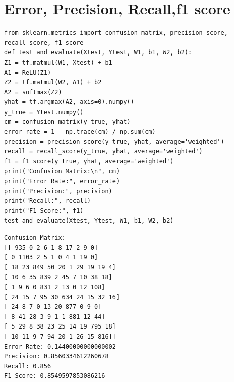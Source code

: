 \section{Error, Precision, Recall,f1 score}
\begin{lstlisting}
from sklearn.metrics import confusion_matrix, precision_score, recall_score, f1_score
def test_and_evaluate(Xtest, Ytest, W1, b1, W2, b2):
Z1 = tf.matmul(W1, Xtest) + b1
A1 = ReLU(Z1)
Z2 = tf.matmul(W2, A1) + b2
A2 = softmax(Z2)
yhat = tf.argmax(A2, axis=0).numpy()
y_true = Ytest.numpy()
cm = confusion_matrix(y_true, yhat)
error_rate = 1 - np.trace(cm) / np.sum(cm)
precision = precision_score(y_true, yhat, average='weighted')
recall = recall_score(y_true, yhat, average='weighted')
f1 = f1_score(y_true, yhat, average='weighted')
print("Confusion Matrix:\n", cm)
print("Error Rate:", error_rate)
print("Precision:", precision)
print("Recall:", recall)
print("F1 Score:", f1)
test_and_evaluate(Xtest, Ytest, W1, b1, W2, b2)
\end{lstlisting}
\begin{verbatim}              
Confusion Matrix:
[[ 935 0 2 6 1 8 17 2 9 0]
[ 0 1103 2 5 1 0 4 1 19 0]
[ 18 23 849 50 20 1 29 19 19 4]
[ 10 6 35 839 2 45 7 10 38 18]
[ 1 9 6 0 831 2 13 0 12 108]
[ 24 15 7 95 30 634 24 15 32 16]
[ 24 8 7 0 13 20 877 0 9 0]
[ 8 41 28 3 9 1 1 881 12 44]
[ 5 29 8 38 23 25 14 19 795 18]
[ 10 11 9 7 94 20 1 26 15 816]]
Error Rate: 0.14400000000000002
Precision: 0.8560334612260678
Recall: 0.856
F1 Score: 0.8549597853086216
\end{verbatim}